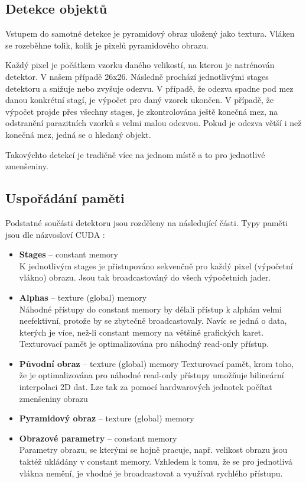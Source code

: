 \documentclass[12pt,a4paper,titlepage,final]{report}
\begin{document}
\subsection{Detekce objektů}
Vstupem do samotné detekce je pyramidový obraz uložený jako textura. Vláken se rozeběhne tolik, kolik je pixelů pyramidového obrazu.

Každý pixel je počátkem vzorku daného velikostí, na kterou je natrénován detektor. V našem případě 26x26. Následně prochází jednotlivými stages detektoru a snižuje nebo zvyšuje odezvu. V případě, že odezva spadne pod mez danou konkrétní stagí, je výpočet pro daný vzorek ukončen. V případě, že výpočet projde přes všechny stages, je zkontrolována ještě konečná mez, na odstranění parazitních vzorků s velmi malou odezvou. Pokud je odezva větší i než konečná mez, jedná se o hledaný objekt.

Takovýchto detekcí je tradičně více na jednom místě a to pro jednotlivé zmenšeniny.

\subsection{Uspořádání paměti}
Podstatné součásti detektoru jsou rozděleny na následující části. Typy paměti jsou dle názvosloví CUDA :

\begin{itemize}
\item \textbf{Stages} – constant memory \\
	K jednotlivým stages je přistupováno sekvenčně pro každý pixel (výpočetní vlákno) obrazu. Jsou tak broadcastováný do všech výpočetních jader.
\item \textbf{Alphas} – texture (global) memory \\
	Náhodné přístupy do constant memory by dělali přístup k alphám velmi neefektivní, protože by se zbytečně broadcastovaly. Navíc se jedná o data, kterých je více, než-li constant memory na většině grafických karet. Texturovací pamět je optimalizována pro náhodný read-only přístup.
	
\item \textbf{Původní obraz} – texture (global) memory
	Texturovací pamět, krom toho, že je optimalizována pro náhodné read-only přístupy umožňuje bilineární interpolaci 2D dat. Lze tak za pomocí hardwarových jednotek počítat zmenšeniny obrazu
	
\item \textbf{Pyramidový obraz} – texture (global) memory

\item \textbf{Obrazové parametry} – constant memory \\
	Parametry obrazu, se kterými se hojně pracuje, např. velikost obrazu jsou taktéž ukládány v constant memory. Vzhledem k tomu, že se pro jednotlivá vlákna nemění, je vhodné je broadcastovat a využívat rychlého přístupu.
\end{itemize}
	
\end{document}
